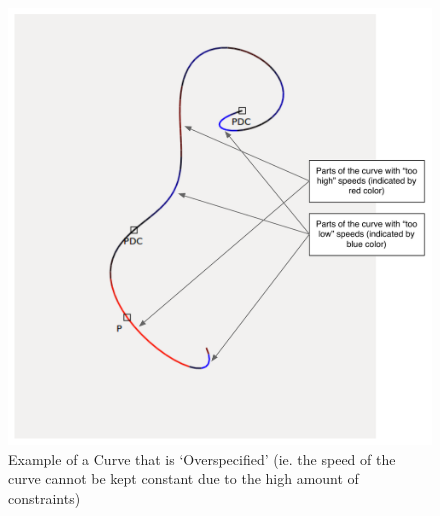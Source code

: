 \documentclass[a4paper]{article}
\begin{document}
				\begin{figure}[htb]
					\centering
					\includegraphics[width=\textwidth]{../resources/ui_speeds.pdf}
					\caption{Example of a Curve that is `Overspecified' (ie. the speed of the curve cannot be kept constant due to the high amount of constraints)}
					\label{figure:ui_speeds}
				\end{figure}
				
\end{document}
